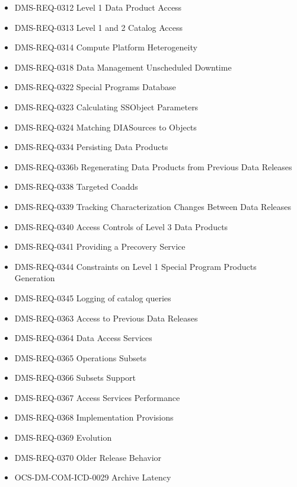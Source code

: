 \begin{itemize}
\item DMS-REQ-0312 Level 1 Data Product Access
\item DMS-REQ-0313 Level 1 and 2 Catalog Access
\item DMS-REQ-0314 Compute Platform Heterogeneity
\item DMS-REQ-0318 Data Management Unscheduled Downtime
\item DMS-REQ-0322 Special Programs Database
\item DMS-REQ-0323 Calculating SSObject Parameters
\item DMS-REQ-0324 Matching DIASources to Objects
\item DMS-REQ-0334 Persisting Data Products
\item DMS-REQ-0336b Regenerating Data Products from Previous Data Releases
\item DMS-REQ-0338 Targeted Coadds
\item DMS-REQ-0339 Tracking Characterization Changes Between Data Releases
\item DMS-REQ-0340 Access Controls of Level 3 Data Products
\item DMS-REQ-0341 Providing a Precovery Service
\item DMS-REQ-0344 Constraints on Level 1 Special Program Products Generation
\item DMS-REQ-0345 Logging of catalog queries
\item DMS-REQ-0363 Access to Previous Data Releases
\item DMS-REQ-0364 Data Access Services
\item DMS-REQ-0365 Operations Subsets
\item DMS-REQ-0366 Subsets Support
\item DMS-REQ-0367 Access Services Performance
\item DMS-REQ-0368 Implementation Provisions
\item DMS-REQ-0369 Evolution
\item DMS-REQ-0370 Older Release Behavior
\item OCS-DM-COM-ICD-0029 Archive Latency
\end{itemize}
